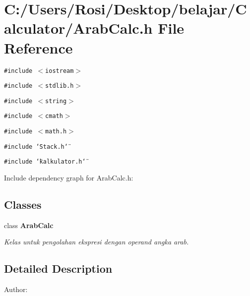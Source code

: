 \section{C:/Users/Rosi/Desktop/belajar/Calculator/Arab\-Calc.h File Reference}
\label{_arab_calc_8h}
{\tt \#include $<$iostream$>$}\par
{\tt \#include $<$stdlib.h$>$}\par
{\tt \#include $<$string$>$}\par
{\tt \#include $<$cmath$>$}\par
{\tt \#include $<$math.h$>$}\par
{\tt \#include \char`\"{}Stack.h\char`\"{}}\par
{\tt \#include \char`\"{}kalkulator.h\char`\"{}}\par


Include dependency graph for Arab\-Calc.h:\subsection*{Classes}
\begin{CompactItemize}
\item 
class {\bf Arab\-Calc}
\begin{CompactList}\small\item\em Kelas untuk pengolahan ekspresi dengan operand angka arab. \item\end{CompactList}\end{CompactItemize}


\subsection{Detailed Description}
\begin{Desc}
\item[Author:]\end{Desc}
